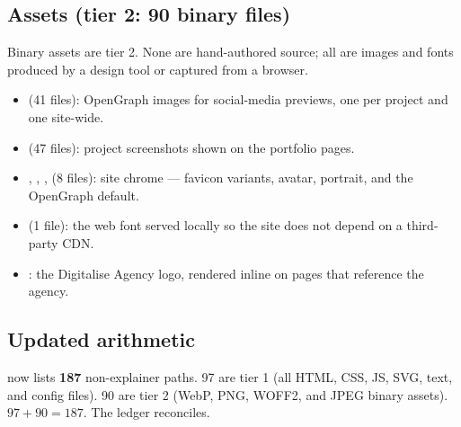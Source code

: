 \documentclass[11pt,a4paper]{article}
\begin{document}
\subsection*{Assets (tier 2: 90 binary files)}

Binary assets are tier 2. None are hand-authored source; all are images and
fonts produced by a design tool or captured from a browser.

\begin{itemize}
  \item {} (41 files): OpenGraph images for
    social-media previews, one per project and one site-wide.
  \item {} (47 files): project
    screenshots shown on the portfolio pages.
  \item {}, , ,
     (8 files): site chrome --- favicon variants, avatar, portrait,
    and the OpenGraph default.
  \item {} (1 file): the web
    font served locally so the site does not depend on a third-party CDN.
  \item {}: the Digitalise Agency logo,
    rendered inline on pages that reference the agency.
\end{itemize}

\subsection*{Updated arithmetic}

 now lists \textbf{187} non-explainer paths.
97 are tier 1 (all HTML, CSS, JS, SVG, text, and config files).
90 are tier 2 (WebP, PNG, WOFF2, and JPEG binary assets).
$97 + 90 = 187$. The ledger reconciles.
\end{document}
